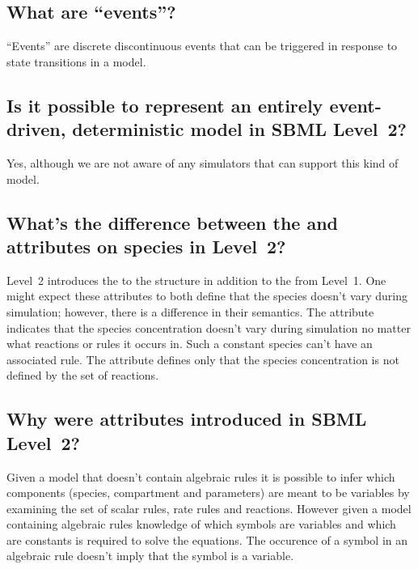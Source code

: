\documentclass{sbmlfaq}
\begin{document}
\subsection{What are ``events''?}

``Events'' are discrete discontinuous events that can be triggered in
response to state transitions in a model.


\subsection{Is it possible to represent an entirely
  event-driven, deterministic model in SBML Level~2?} 

Yes, although we are not aware of any simulators that can support this kind
of model.


\subsection{What's the difference between the \textup{}
  and \textup{} attributes on species in Level~2?}

Level~2 introduces the  to the  structure
in addition to the  from Level~1.  One might
expect these attributes to both define that the species doesn't vary during
simulation; however, there is a difference in their semantics.  The
 attribute indicates that the species concentration
doesn't vary during simulation no matter what reactions or rules it occurs
in.  Such a constant species can't have an associated rule.  The
 attribute defines only that the species
concentration is not defined by the set of reactions.


\subsection{Why were  attributes introduced in SBML Level~2?}

Given a model that doesn't contain algebraic rules it is possible to infer 
which components (species, compartment and parameters) are meant to be variables
by examining the set of scalar rules, rate rules and reactions.
However given a model
containing algebraic rules knowledge of which symbols are
variables and which are constants is required to solve the equations.
The occurence of a symbol in an algebraic rule doesn't imply that
the symbol is a variable.   
\end{document}
